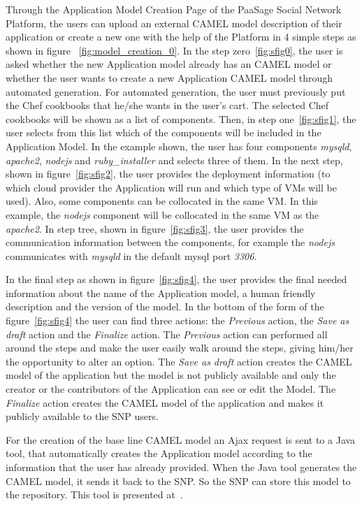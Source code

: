 Through the Application Model Creation Page of the PaaSage Social Network Platform, the users can upload an external CAMEL model description of their application or create a new one with the help of the Platform in 4 simple steps as shown in figure ~\ref{fig:model_creation_0}. In the step zero~\ref{fig:sfig0}, the user is asked whether the new Application model already has an CAMEL model or whether the user wants to create a new Application CAMEL model through automated generation. For automated generation, the user must previously put the Chef cookbooks that he/she wants in the user's cart. The selected Chef cookbooks will be shown as a list of components. Then, in step one~\ref{fig:sfig1}, the user selects from this list which of the components will be included in the Application Model. 
In the example shown, the user has four components {\it mysqld}, {\it apache2}, {\it nodejs} and 
{\it ruby\_installer} and selects three of them. In the next step, shown in figure~\ref{fig:sfig2}, the user provides the deployment information (to which cloud provider the Application will run and which type of VMs will be used). Also, some components can be collocated in the same VM. In this example, the {\it nodejs} component will be collocated in the same VM as the {\it apache2}. In step tree, shown in figure~\ref{fig:sfig3}, the user provides the communication information between the components, for example the 
{\it nodejs} communicates with {\it mysqld} in the default mysql port {\it 3306}.

In the final step as shown in figure~\ref{fig:sfig4}, the user provides the final needed information about the name of the Application model, a human friendly description and the version of the model. In the bottom of the form of the figure~\ref{fig:sfig4} the user can find three actions: the \emph{Previous} action, the \emph{Save as draft} action and the \emph{Finalize} action. The \emph{Previous} action can performed all around the steps and make the user easily walk around the steps, giving him/her the opportunity to alter an option. The \emph{Save as draft} action creates the CAMEL model of the application but the model is not publicly available and only the creator or the contributors of the Application can see or edit the Model. The \emph{Finalize} action creates the CAMEL model of the application and makes it publicly available to the SNP users. 

For the creation of the base line CAMEL model an Ajax request is sent to a Java tool, that automatically creates the Application model according to the information that the user has already provided. When the Java tool generates the CAMEL model, it sends it back to the SNP. So the SNP can store this model to the repository. This tool is presented at~\cite{papoutsakis2014reducing}. 

